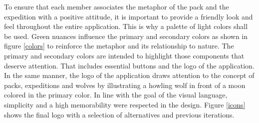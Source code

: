 \documentclass[12pt,numbers=noenddot,parskip,bibliography=totocnumbered,listof=totocnumbered,draft]{scrreprt}
\begin{document}
To ensure that each member associates the metaphor of the pack and the expedition with a positive attitude, it is important to provide a friendly look and feel throughout the entire application. This is why a palette of light colors shall be used. Green nuances influence the primary and secondary colors as shown in figure \ref{colors} to reinforce the metaphor and its relationship to nature. The primary and secondary colors are intended to highlight those components that deserve attention. That includes essential buttons and the logo of the application. In the same manner, the logo of the application draws attention to the concept of packs, expeditions and wolves by illustrating a howling wolf in front of a moon colored in the primary color. In line with the goal of the visual language, simplicity and a high memorability were respected in the design. Figure \ref{icons} shows the final logo with a selection of alternatives and previous iterations.
 
\end{document}
